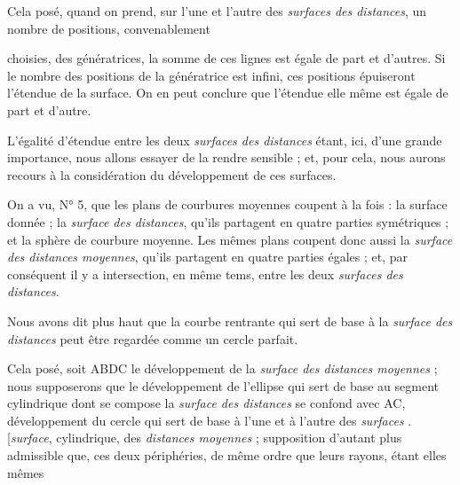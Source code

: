 \documentclass[11pt,a4paper]{article}
\begin{document}
Cela posé, quand on prend, sur l'une et l'autre des \emph{surfaces des
distances}, un nombre de positions, convenablement

choisies, des génératrices, la somme de ces lignes est égale de part et
d'autres. Si le nombre des positions de la génératrice est infini, ces
positions épuiseront l'étendue de la surface. On en peut conclure que
l'étendue elle même est égale de part et d'autre.

L'égalité d'étendue entre les deux \emph{surfaces des distances} étant, ici,
d'une grande importance, nous allons essayer de la rendre sensible ; et,
pour cela, nous aurons recours à la considération du développement de ces
surfaces.

On a vu, N° 5, que les plans de courbures moyennes coupent à la fois : la
surface donnée ; la \emph{surface des distances}, qu'ils partagent en quatre
parties symétriques ; et la sphère de courbure moyenne. Les mêmes plans
coupent donc aussi la \emph{surface des distances moyennes}, qu'ils
partagent en quatre parties égales ; et, par conséquent il y a
intersection, en même tems, entre les deux \emph{surfaces des distances}.

\marginal{\ill{}}


Nous avons dit plus haut que la courbe rentrante qui sert de base à la
\emph{surface des distances} peut être regardée comme un cercle parfait.


Cela posé, soit ABDC le développement de la \emph{surface des distances
moyennes} ; nous supposerons que le développement de l'ellipse qui sert de
base au segment cylindrique dont se compose la \emph{surface des distances}
se confond avec AC, développement du cercle qui sert de base à 
l'une et à l'autre des \emph{surfaces} .
[\emph{surface}, cylindrique, des \emph{distances moyennes} ; supposition
d'autant plus admissible que, ces deux périphéries, de même ordre que leurs
rayons, étant elles mêmes

\end{document}
